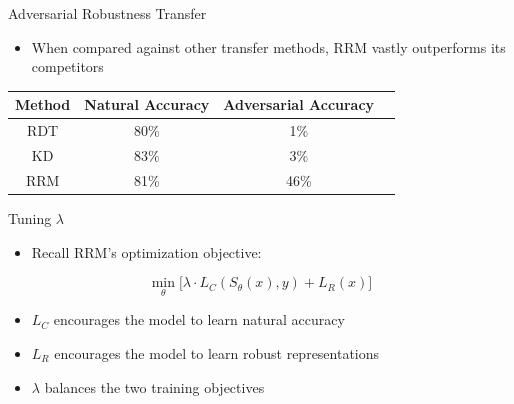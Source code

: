 \documentclass{beamer}
\begin{document}


\begin{frame}{Adversarial Robustness Transfer}
	
	\begin{itemize}
		\item When compared against other transfer methods, RRM vastly outperforms its competitors
\end{itemize}

\begin{center}
	\begin{tabular}{ |c|c|c|c| } 
		\hline
		Method & Natural Accuracy & Adversarial Accuracy \\
		\hline
		RDT & 80\% & 1\% \\
		KD & 83\% & 3\% \\
		RRM & 81\% & 46\% \\
		\hline
	\end{tabular}
\end{center}
	
\end{frame}



\begin{frame}{Tuning $\lambda$}
	
	\begin{itemize}
		\item Recall RRM's optimization objective:
	\end{itemize}

	$$\min_\theta \biggr [ \lambda \cdot L_C(S_\theta(x), y) + L_R(x) \biggr ]$$
	
	\begin{itemize}
		\item $L_C$ encourages the model to learn natural accuracy
		\item $L_R$ encourages the model to learn robust representations
		\item $\lambda$ balances the two training objectives
	\end{itemize}
	
\end{frame}


\end{document}
